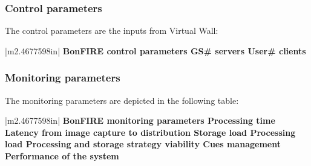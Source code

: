 \documentclass[a4paper]{article}
\makeatletter
\newcommand\arraybslash{\let\\\@arraycr}
\makeatother
\begin{document}
\bigskip

\subsubsection[Control parameters]{Control parameters}
\hypertarget{Toc381777225}{}
\bigskip

The control parameters are the inputs from Virtual Wall:


\bigskip

\begin{center}
\tablehead{}
\begin{supertabular}{|m{2.4677598in}|}
\hline
\centering\arraybslash \bfseries BonFIRE control parameters\\\hline
\centering\arraybslash GS\# servers\\\hline
\centering\arraybslash User\# clients\\\hline
\end{supertabular}
\end{center}

\bigskip

\subsubsection[Monitoring parameters]{Monitoring parameters}
\hypertarget{Toc381777226}{}
\bigskip

The monitoring parameters are depicted in the following table:


\bigskip


\bigskip

\begin{center}
\tablehead{}
\begin{supertabular}{|m{2.4677598in}|}
\hline
\centering\arraybslash \bfseries BonFIRE monitoring parameters\\\hline
\centering\arraybslash Processing time\\\hline
\centering\arraybslash Latency from image capture to
distribution\\\hline
\centering\arraybslash Storage load\\\hline
\centering\arraybslash Processing load\\\hline
\centering\arraybslash Processing and storage strategy viability\\\hline
\centering\arraybslash Cues management\\\hline
\centering\arraybslash Performance of the system\\\hline
\end{supertabular}
\end{center}
\end{document}
